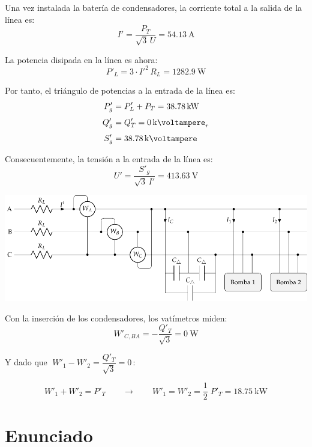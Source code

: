 Una vez instalada la batería de condensadores, la corriente total a la salida de la línea es:
\[
I' = \frac{P_T}{\sqrt{3} \, U} = \SI{54.13}{\ampere}
\]

La potencia disipada en la línea es ahora:
\[
P'_L = 3 \cdot I'^2 \, R_L = \SI{1282.9}{\watt} 
\]

Por tanto, el triángulo de potencias a la entrada de la línea es:
\begin{align*}
P'_g &= P'_L + P_T = \SI{38.78}{\kilo\watt}\\[3pt]
Q'_g &= Q'_T = \SI{0}{\kilo\voltampere}_r\\[3pt]
S'_g &= \SI{38.78}{\kilo\voltampere}
\end{align*}

Consecuentemente, la tensión a la entrada de la línea es:
\[
U' = \frac{S'_g}{\sqrt{3} \, I'} = \SI{413.63}{\volt}
\]

\begin{center}
    \includegraphics[width=1\textwidth]{figuras/BT3_ej5_bombas_condensadores_vat.pdf}
\end{center}

\vspace{2mm}
Con la inserción de los condensadores, los vatímetros miden:
\[
    W'_{C, BA} = - \frac{Q'_T}{\sqrt{3}} = \SI{0}{\watt}
\]

\vspace{-2mm}
Y dado que $\; W'_1 - W'_2 = \dfrac{Q'_T}{\sqrt{3}} = 0 \,$:

\vspace{2mm}
\[
    W'_1 + W'_2 = P'_T 
    \qquad \rightarrow \qquad    
    W'_1 = W'_2 = \frac{1}{2} \; P'_T = \SI{18.75}{\kilo\watt}
\]



\section{Enunciado}

